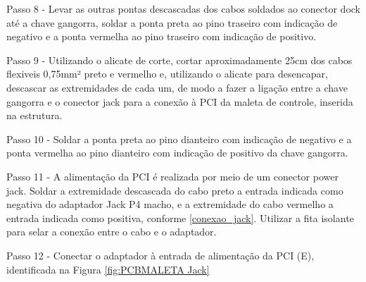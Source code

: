 Passo 8 - Levar as outras pontas descascadas dos cabos soldados ao conector dock até a chave gangorra, soldar a ponta preta ao pino traseiro com indicação de negativo e a ponta vermelha ao pino traseiro com indicação de positivo.

Passo 9 - Utilizando o alicate de corte, cortar aproximadamente 25cm dos cabos flexiveis 0,75mm² preto e vermelho e, utilizando o alicate para desencapar, descascar as extremidades de cada um, de modo a fazer a ligação entre a chave gangorra e o conector jack para a conexão à PCI da maleta de controle, inserida na estrutura.

Passo 10 - Soldar a ponta preta ao pino dianteiro com indicação de negativo e a ponta vermelha ao pino dianteiro com indicação de positivo da chave gangorra.

Passo 11 -  A alimentação da PCI é realizada por meio de um conector power jack. Soldar a extremidade descascada do cabo preto a entrada indicada como negativa do adaptador Jack P4 macho, e a extremidade do cabo vermelho a entrada indicada como positiva, conforme \ref{conexao_jack}. Utilizar a fita isolante para selar a conexão entre o cabo e o adaptador.

Passo 12 - Conectar o adaptador à entrada de alimentação da PCI (E), identificada na Figura \ref{fig:PCBMALETA Jack}


